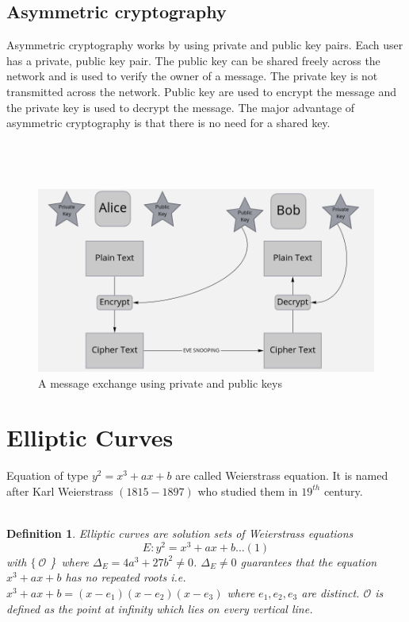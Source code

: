 \documentclass[a4paper,12pt]{report}
\newtheorem{definition}{Definition}
\begin{document}
\subsection{Asymmetric cryptography}
Asymmetric cryptography works by using private and public key pairs.
Each user has a private, public key pair. The public key can be shared freely across the network and is used to verify the owner of a message.
The private key is not transmitted across the network. Public key are used to encrypt the message and the private key is used to decrypt the message. The major advantage of asymmetric cryptography is that there is no need for a shared key. \\\\\\\\

\begin{figure}[h!]
	\begin{center}
		\caption{A message exchange using private and public keys}
		\includegraphics[scale=0.42]{asym}
	\end{center}
\end{figure}
\cleardoublepage

\section{Elliptic Curves}
Equation of type $ y^2 = x^3+ax+b $ are called Weierstrass equation. It is named after Karl Weierstrass $(1815-1897)$ who studied them in $19^{th}$ century. \\\\
\begin{definition}
	Elliptic curves are solution sets of Weierstrass equations
	$$E:y^2 = x^3+ax+b ...(1)$$ with  $ \{\ \mathscr{O}  $ \}\ where $\Delta_E = 4a^3+27b^2\neq 0$.
	$\Delta_E \neq 0$ guarantees that the equation $x^3+ax+b$ has no repeated roots i.e.
	$ x^3+ax+b=(x-e_1)(x-e_2)(x-e_3)$ where $e_1,e_2,e_3$ are distinct. $  \mathscr{O}  $  is defined as the point at infinity which lies on every vertical line.\\
\end{definition}
\end{document}
